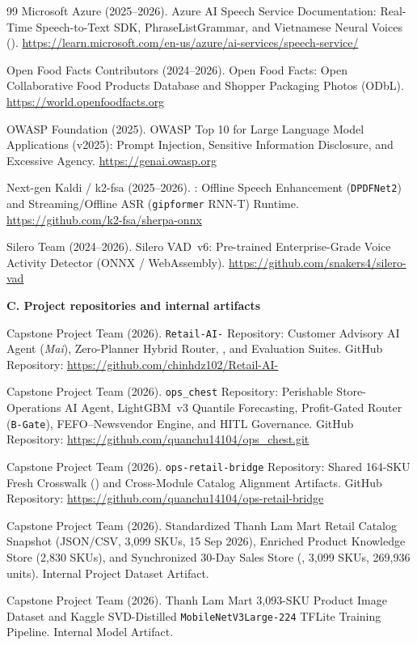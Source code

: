 \begin{thebibliography}{99}
Microsoft Azure (2025--2026).
Azure AI Speech Service Documentation: Real-Time Speech-to-Text SDK, PhraseListGrammar, and Vietnamese Neural Voices ().
\url{https://learn.microsoft.com/en-us/azure/ai-services/speech-service/}

Open Food Facts Contributors (2024--2026).
Open Food Facts: Open Collaborative Food Products Database and Shopper Packaging Photos (ODbL).
\url{https://world.openfoodfacts.org}

OWASP Foundation (2025).
OWASP Top 10 for Large Language Model Applications (v2025): Prompt Injection, Sensitive Information Disclosure, and Excessive Agency.
\url{https://genai.owasp.org}

Next-gen Kaldi / k2-fsa (2025--2026).
: Offline Speech Enhancement (\texttt{DPDFNet2}) and Streaming/Offline ASR (\texttt{gipformer} RNN-T) Runtime.
\url{https://github.com/k2-fsa/sherpa-onnx}

Silero Team (2024--2026).
Silero VAD~v6: Pre-trained Enterprise-Grade Voice Activity Detector (ONNX / WebAssembly).
\url{https://github.com/snakers4/silero-vad}

\item[]\hspace*{-\leftmargin}\textbf{C. Project repositories and internal artifacts}

Capstone Project Team (2026).
\texttt{Retail-AI-} Repository: Customer Advisory AI Agent (\emph{Mai}), Zero-Planner Hybrid Router, , and Evaluation Suites.
GitHub Repository: \url{https://github.com/chinhdz102/Retail-AI-}

Capstone Project Team (2026).
\texttt{ops\_chest} Repository: Perishable Store-Operations AI Agent, LightGBM~v3 Quantile Forecasting, Profit-Gated Router (\texttt{B-Gate}), FEFO--Newsvendor Engine, and HITL Governance.
GitHub Repository: \url{https://github.com/quanchu14104/ops_chest.git}

Capstone Project Team (2026).
\texttt{ops-retail-bridge} Repository: Shared 164-SKU Fresh Crosswalk () and Cross-Module Catalog Alignment Artifacts.
GitHub Repository: \url{https://github.com/quanchu14104/ops-retail-bridge}

Capstone Project Team (2026).
Standardized Thanh Lam Mart Retail Catalog Snapshot (JSON/CSV, 3,099 SKUs, 15 Sep 2026), Enriched Product Knowledge Store (2,830 SKUs), and Synchronized 30-Day Sales Store (, 3,099 SKUs, 269,936 units).
Internal Project Dataset Artifact.

Capstone Project Team (2026).
Thanh Lam Mart 3,093-SKU Product Image Dataset and Kaggle SVD-Distilled \texttt{MobileNetV3Large-224} TFLite Training Pipeline.
Internal Model Artifact.

\end{thebibliography}

